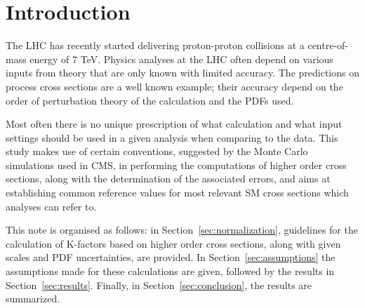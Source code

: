 \section{Introduction}
\label{sec:intro}
The LHC has recently started delivering proton-proton collisions at a 
centre-of-mass energy of 7 TeV. Physics analyses at the LHC often depend 
on various inputs from theory that are only known with limited accuracy. The 
predictions on process cross sections are a well known example; their 
accuracy depend on the order of perturbation theory of the calculation and
the PDFs used. 

Most often there is no unique prescription of what calculation and what input 
settings should be used in a given analysis when comparing to the data. 
This study makes use of certain conventions, suggested by the 
Monte Carlo simulations used in CMS, in performing the computations of
higher order cross sections, along with the determination of the associated
errors, and aims at establishing common reference values for most relevant
SM cross sections which analyses can refer to.

This note is organised as follows:
in Section~\ref{sec:normalization}, guidelines for the calculation of K-factors 
based on higher order cross sections, along with given scales and PDF 
uncertainties, are provided. In Section~\ref{sec:assumptions} the assumptions 
made for these calculations are given, followed by the results in 
Section~\ref{sec:results}. Finally, in Section~\ref{sec:conclusion}, the 
results are summarized.
